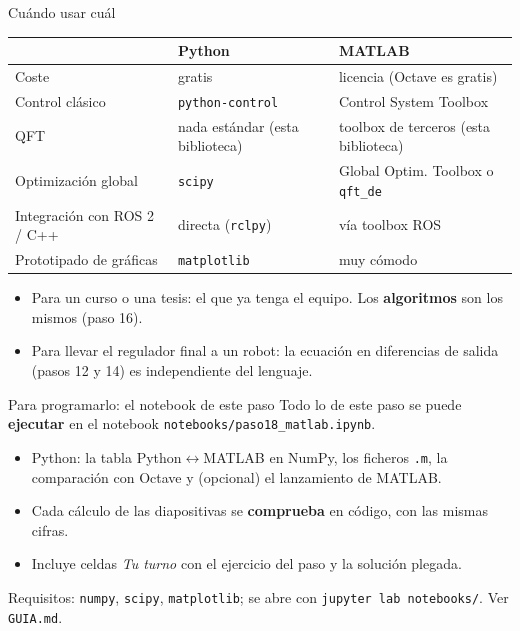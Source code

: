 \documentclass[aspectratio=169,11pt]{beamer}
\begin{document}
\begin{frame}{Cuándo usar cuál}
  \footnotesize
  \begin{center}
  \begin{tabular}{l|l|l}
    & Python & MATLAB\\\hline
    Coste & gratis & licencia (Octave es gratis)\\
    Control clásico & \texttt{python-control} & Control System Toolbox\\
    QFT & nada estándar (esta biblioteca) & toolbox de terceros (esta biblioteca)\\
    Optimización global & \texttt{scipy} & Global Optim. Toolbox o \texttt{qft\_de}\\
    Integración con ROS 2 / C++ & directa (\texttt{rclpy}) & vía toolbox ROS\\
    Prototipado de gráficas & \texttt{matplotlib} & muy cómodo
  \end{tabular}
  \end{center}
  \begin{itemize}
    \item Para un curso o una tesis: el que ya tenga el equipo. Los \textbf{algoritmos} son los mismos (paso 16).
    \item Para llevar el regulador final a un robot: la ecuación en diferencias de salida (pasos 12 y 14) es independiente del lenguaje.
  \end{itemize}
\end{frame}

\begin{frame}{Para programarlo: el notebook de este paso}
  \small
  Todo lo de este paso se puede \textbf{ejecutar} en el notebook \texttt{notebooks/paso18\_matlab.ipynb}.
  \begin{itemize}
    \item Python: la tabla Python$\leftrightarrow$MATLAB en NumPy, los ficheros \texttt{.m}, la comparación con Octave y (opcional) el lanzamiento de MATLAB.
    \item Cada cálculo de las diapositivas se \textbf{comprueba} en código, con las mismas cifras.
    \item Incluye celdas \emph{Tu turno} con el ejercicio del paso y la solución plegada.
  \end{itemize}
  \footnotesize Requisitos: \texttt{numpy}, \texttt{scipy}, \texttt{matplotlib}; se abre con \texttt{jupyter lab notebooks/}. Ver \texttt{GUIA.md}.
\end{frame}
\end{document}
